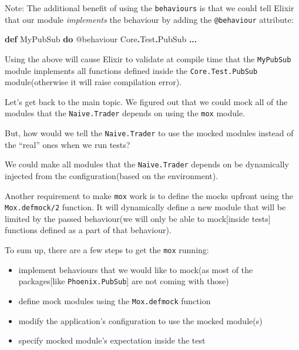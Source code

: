 \documentclass[
  oneside]{book}
\newenvironment{Shaded}{\begin{snugshade}}{\end{snugshade}}
\newcommand{\ConstantTok}[1]{\textcolor[rgb]{0.56,0.35,0.01}{#1}}
\newcommand{\KeywordTok}[1]{\textcolor[rgb]{0.13,0.29,0.53}{\textbf{#1}}}
\newcommand{\OperatorTok}[1]{\textcolor[rgb]{0.81,0.36,0.00}{\textbf{#1}}}
\newcommand{\OtherTok}[1]{\textcolor[rgb]{0.56,0.35,0.01}{#1}}
\providecommand{\tightlist}{%
  \setlength{\itemsep}{0pt}\setlength{\parskip}{0pt}}
\begin{document}
Note: The additional benefit of using the \texttt{behaviours} is that we could tell Elixir that our module \emph{implements} the behaviour by adding the \texttt{@behaviour} attribute:

\begin{Shaded}
\begin{Highlighting}[]
\KeywordTok{def} \ConstantTok{MyPubSub} \KeywordTok{do}
    \OtherTok{@behaviour} \ConstantTok{Core}\OperatorTok{.}\ConstantTok{Test}\OperatorTok{.}\ConstantTok{PubSub}
    \OperatorTok{...}
\end{Highlighting}
\end{Shaded}

Using the above will cause Elixir to validate at compile time that the \texttt{MyPubSub} module implements all functions defined inside the \texttt{Core.Test.PubSub} module(otherwise it will raise compilation error).

Let's get back to the main topic. We figured out that we could mock all of the modules that the \texttt{Naive.Trader} depends on using the \texttt{mox} module.

But, how would we tell the \texttt{Naive.Trader} to use the mocked modules instead of the ``real'' ones when we run tests?

We could make all modules that the \texttt{Naive.Trader} depends on be dynamically injected from the configuration(based on the environment).

Another requirement to make \texttt{mox} work is to define the mocks upfront using the \texttt{Mox.defmock/2} function. It will dynamically define a new module that will be limited by the passed behaviour(we will only be able to mock{[}inside tests{]} functions defined as a part of that behaviour).

\newpage

To sum up, there are a few steps to get the \texttt{mox} running:

\begin{itemize}
\tightlist
\item
  implement behaviours that we would like to mock(as most of the packages{[}like \texttt{Phoenix.PubSub}{]} are not coming with those)
\item
  define mock modules using the \texttt{Mox.defmock} function
\item
  modify the application's configuration to use the mocked module(s)
\item
  specify mocked module's expectation inside the test
\end{itemize}
\end{document}
